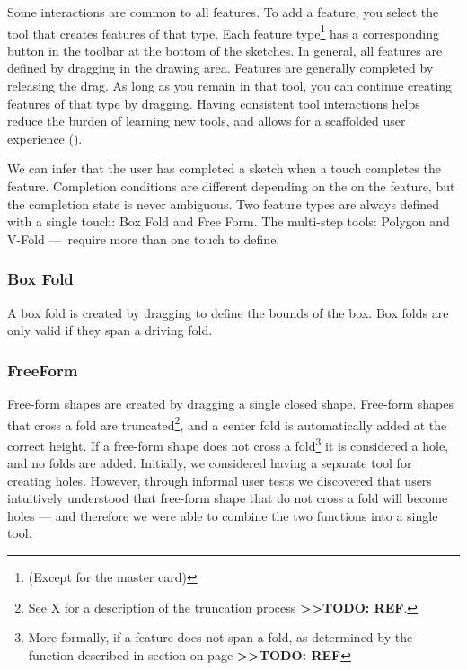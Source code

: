 Some interactions are common to all features. To add a feature, you
select the tool that creates features of that type. Each feature
type\footnote{(Except for the master card)} has a corresponding button
in the toolbar at the bottom of the sketches. In general, all features
are defined by dragging in the drawing area. Features are generally
completed by releasing the drag. As long as you remain in that tool, you
can continue creating features of that type by dragging. Having
consistent tool interactions helps reduce the burden of learning new
tools, and allows for a scaffolded user experience
(\citet{wood2001scaffolding}).

We can infer that the user has completed a sketch when a touch completes
the feature. Completion conditions are different depending on the on the
feature, but the completion state is never ambiguous. Two feature types
are always defined with a single touch: Box Fold and Free Form. The
multi-step tools: Polygon and V-Fold ---~require more than one touch to
define.

\subsubsection{Box Fold}\label{box-fold}

A box fold is created by dragging to define the bounds of the box. Box
folds are only valid if they span a driving fold.

\subsubsection{FreeForm}\label{freeform}

Free-form shapes are created by dragging a single closed shape.
Free-form shapes that cross a fold are truncated\footnote{See X for a
  description of the truncation process
  \textbf{\textgreater{}\textgreater{}TODO: REF}.}, and a center fold is
automatically added at the correct height. If a free-form shape does not
cross a fold\footnote{More formally, if a feature does not span a fold,
  as determined by the function described in section on page
  \textbf{\textgreater{}\textgreater{}TODO: REF}} it is considered a
hole, and no folds are added. Initially, we considered having a separate
tool for creating holes. However, through informal user tests we
discovered that users intuitively understood that free-form shape that
do not cross a fold will become holes --- and therefore we were able to
combine the two functions into a single tool.

